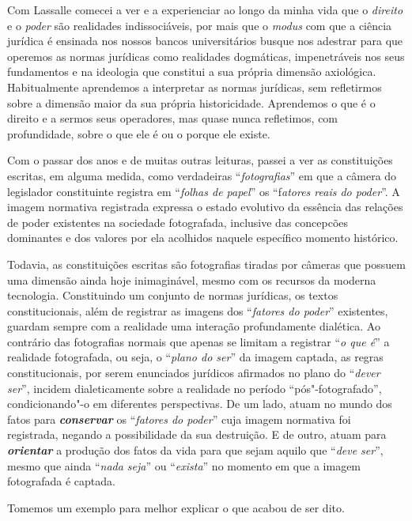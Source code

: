 Com Lassalle comecei a ver e a experienciar ao longo da minha vida que o
\emph{direito} e o \emph{poder} são realidades indissociáveis, por mais
que o \emph{modus} com que a ciência jurídica é ensinada nos nossos
bancos universitários busque nos adestrar para que operemos as normas
jurídicas como realidades dogmáticas, impenetráveis nos seus fundamentos
e na ideologia que constitui a sua própria dimensão axiológica.
Habitualmente aprendemos a interpretar as normas jurídicas, sem
refletirmos sobre a dimensão maior da sua própria historicidade.
Aprendemos o que é o direito e a sermos seus operadores, mas quase nunca
refletimos, com profundidade, sobre o que ele é ou o porque ele existe.

Com o passar dos anos e de muitas outras leituras, passei a ver as
constituições escritas, em alguma medida, como verdadeiras
``\emph{fotografias}'' em que a câmera do legislador constituinte
registra em ``\emph{folhas de papel}'' os ``f\emph{atores reais do
poder}''. A imagem normativa registrada expressa o estado evolutivo da
essência das relações de poder existentes na sociedade fotografada,
inclusive das concepcões dominantes e dos valores por ela acolhidos
naquele específico momento histórico.

Todavia, as constituições escritas são fotografias tiradas por câmeras
que possuem uma dimensão ainda hoje inimaginável, mesmo com os recursos
da moderna tecnologia. Constituindo um conjunto de normas jurídicas, os
textos constitucionais, além de registrar as imagens dos ``\emph{fatores
do poder}'' existentes, guardam sempre com a realidade uma interação
profundamente dialética. Ao contrário das fotografias normais que apenas
se limitam a registrar ``\emph{o que é}'' a realidade fotografada, ou
seja, o ``\emph{plano do ser}'' da imagem captada, as regras
constitucionais, por serem enunciados jurídicos afirmados no plano do
``\emph{dever ser}'', incidem dialeticamente sobre a realidade no
período ``pós"-fotografado'', condicionando"-o em diferentes perspectivas.
De um lado, atuam no mundo dos fatos para \textbf{\emph{conservar}} os
``\emph{fatores do poder}'' cuja imagem normativa foi registrada,
negando a possibilidade da sua destruição. E de outro, atuam para
\textbf{\emph{orientar}} a produção dos fatos da vida para que sejam
aquilo que ``\emph{deve ser}'', mesmo que ainda ``\emph{nada seja}'' ou
``\emph{exista}'' no momento em que a imagem fotografada é captada.

Tomemos um exemplo para melhor explicar o que acabou de ser dito.

